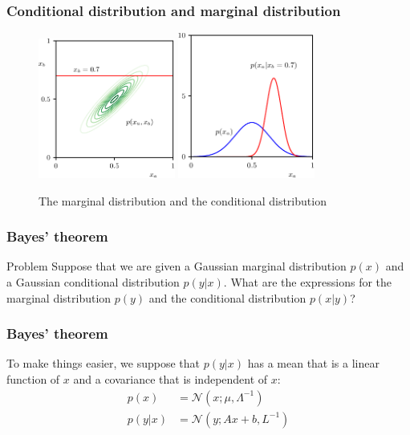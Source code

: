 \documentclass{beamer}
\begin{document}
\begin{frame}
    \frametitle{Conditional distribution and marginal distribution}
    \begin{figure}
        \caption{The marginal distribution and the conditional distribution}
        \includegraphics[width=0.4\textwidth]{Figure_5_a.pdf}
        \includegraphics[width=0.4\textwidth]{Figure_5_b.pdf}
    \end{figure}
\end{frame}

\begin{frame}
    \frametitle{Bayes' theorem}
    \begin{block}{Problem}
        Suppose that we are given a Gaussian marginal distribution $p(x)$ and a Gaussian conditional distribution $p(y|x)$. What are the expressions for the marginal distribution $p(y)$ and the conditional distribution $p(x|y)$?
    \end{block}
\end{frame}

\begin{frame}
    \frametitle{Bayes' theorem}
    To make things easier, we suppose that $p(y|x)$ has a mean that is a linear function of $x$ and a covariance that is independent of $x$:
    \begin{align*}
        p(x)&=\mathcal{N}(x;\mu,\Lambda^{-1}) \\
        p(y|x)&=\mathcal{N}(y;Ax+b,L^{-1})
    \end{align*}
\end{frame}
\end{document}
